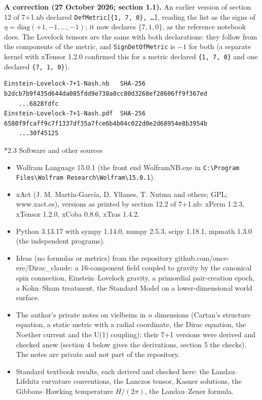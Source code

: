 \documentclass[10pt,a4paper]{article}
\makeatletter
\renewcommand\subsection{\@startsection{subsection}{2}{\z@}{-3.25ex\@plus -1ex \@minus -.2ex}{1.5ex \@plus .2ex}{\normalfont\large\bfseries\raggedright}}
\makeatother
\begin{document}
\textbf{A correction (27 October 2026; section 1.1).} An earlier version of section 12 of 7+1.nb declared \texttt{DefMetric[\{1, 7, 0\}, …]}, reading the list as the signs of $\eta=\mathrm{diag}(+1,-1,\dots,-1)$; it now declares $\{7,1,0\}$, as the reference notebook does. The Lovelock tensors are the same with both declarations: they follow from the components of the metric, and \texttt{SignDetOfMetric} is $-1$ for both (a separate kernel with xTensor 1.2.0 confirmed this for a metric declared \texttt{\{1, 7, 0\}} and one declared \texttt{\{7, 1, 0\}}).

\begin{Verbatim}[fontsize=\small,frame=single,framesep=2mm]
Einstein-Lovelock-7+1-Nash.nb   SHA-256 b2dcb7b9f435d644da085fdd9e738a0cc80d3268ef28606ff9f367ed
    ...6828fdfc
Einstein-Lovelock-7+1-Nash.pdf  SHA-256 6580f9fcaff9c7f1337df35a7fce6b4b04c022d0e2d68954e8b3954b
    ...30f45125
\end{Verbatim}
\subsection*{2.3 Software and other sources}
\begin{itemize}
\item Wolfram Language 15.0.1 (the front end WolframNB.exe in \texttt{C:\textbackslash{}\allowbreak{}Program Files\textbackslash{}\allowbreak{}Wolfram Research\textbackslash{}\allowbreak{}Wolfram\textbackslash{}\allowbreak{}15.0.1}).
\item xAct (J. M. Martín-García, D. Yllanes, T. Nutma and others; GPL; www.xact.es), versions as printed by section 12.2 of 7+1.nb: xPerm 1.2.3, xTensor 1.2.0, xCoba 0.8.6, xTras 1.4.2.
\item Python 3.13.17 with sympy 1.14.0, numpy 2.5.3, scipy 1.18.1, mpmath 1.3.0 (the independent programs).
\item Ideas (no formulas or metrics) from the repository github.com/once-ere/Dirac\_claude: a 16-component field coupled to gravity by the canonical spin connection, Einstein–Lovelock gravity, a primordial pair-creation epoch, a Kohn–Sham treatment, the Standard Model on a lower-dimensional world surface.
\item The author’s private notes on vielbeins in $n$ dimensions (Cartan’s structure equation, a static metric with a radial coordinate, the Dirac equation, the Noether current and the U(1) coupling): their 7+1 versions were derived and checked anew (section 4 below gives the derivations, section 5 the checks). The notes are private and not part of the repository.
\item Standard textbook results, each derived and checked here: the Landau–Lifshitz curvature conventions, the Lanczos tensor, Kasner solutions, the Gibbons–Hawking temperature $H/(2\pi)$, the Landau–Zener formula.
\end{itemize}
\end{document}
